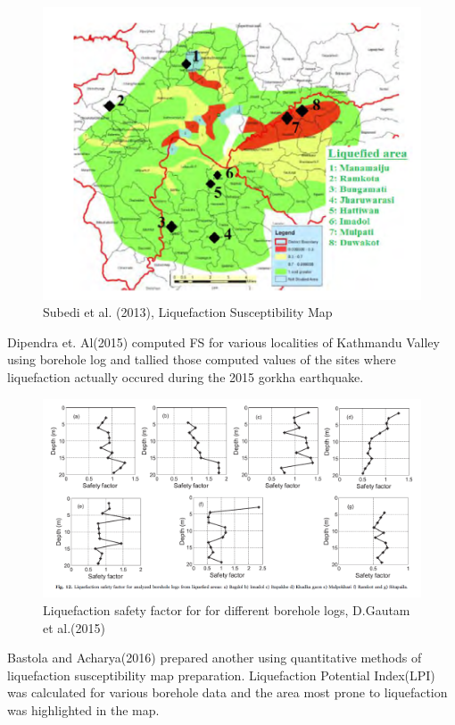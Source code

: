 \begin{figure}[!hbt]
\centering
\includegraphics[width=0.5\linewidth,keepaspectratio]{images/main/dipendra.png}
\caption{Subedi et al. (2013), Liquefaction Susceptibility Map}
\end{figure}

Dipendra et. Al(2015)\cite{r30} computed FS for various localities of Kathmandu Valley using borehole log and tallied those computed values of the sites where liquefaction actually occured during the 2015 gorkha earthquake.

\begin{figure}[!hbt]
\centering
\includegraphics[width=0.5\linewidth,keepaspectratio]{images/main/bastola_acharya.png}
\caption{Liquefaction safety factor for for different borehole logs, D.Gautam et al.(2015)}
\end{figure}

Bastola and Acharya(2016)\cite{r31} prepared another using quantitative methods of  liquefaction susceptibility map preparation. Liquefaction Potential Index(LPI) was calculated for various borehole data and the area most prone to liquefaction was highlighted in the map. 

